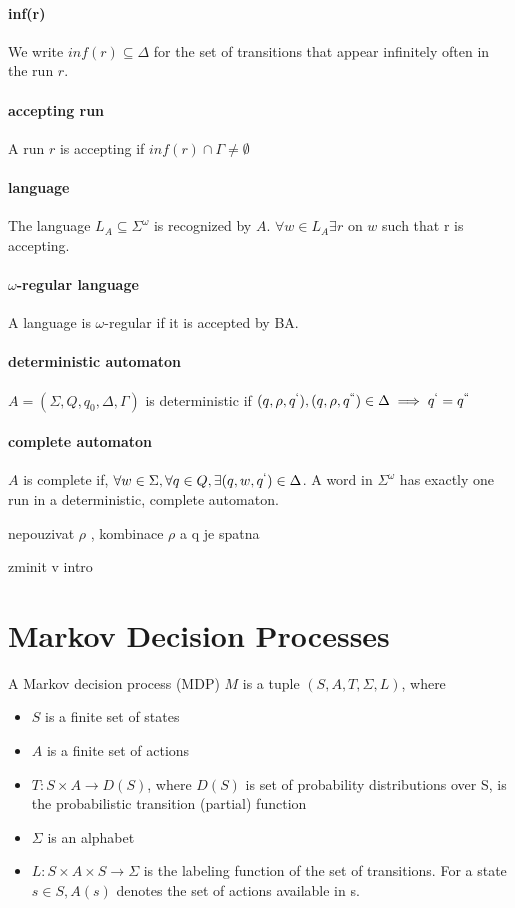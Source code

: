 \documentclass{fithesis3}
\begin{document}
		\paragraph{inf(r)}
		We write $inf(r) \subseteq \Delta$ for the set of transitions that appear infinitely often in the run $r$.
		\paragraph{accepting run} A run $r$ is accepting if $inf(r) \cap \Gamma \neq \emptyset$
		\paragraph{language}
		The language $L_A\subseteq\Sigma^\omega$ is recognized by $A$.\newline
		$\forall w \in L_A \exists r$ on $w$ such that r is accepting.
		\paragraph{$\omega$-regular language}
		A language is $\omega$-regular if it is accepted by BA.
		\paragraph{deterministic automaton}
		$A=(\Sigma, Q, q_0, \Delta, \Gamma)$ is deterministic if \newline$(q, \rho, q^`), (q, \rho, q^{``})\in\Delta\implies q^`=q^{``}$
		\paragraph{complete automaton}
		$A$ is complete if, $\forall w \in \Sigma, \forall q \in Q, \exists (q, w, q^`)\in\Delta$. A word in $\Sigma^\omega$ has exactly one run in a deterministic, complete automaton.
		
		nepouzivat $\rho$ , kombinace $\rho$ a q je spatna
		
		zminit v intro
		\section{Markov Decision Processes}
		A Markov decision process (MDP) $M$
		is a tuple $(S, A, T, \Sigma, L)$, where
		\begin{itemize}
			\item $S$ is a finite set of states
			\item $A$ is a finite set of actions
			\item $T:S\times A \rightarrow D(S)$, where $D(S)$ is set of probability distributions over S, is  the probabilistic transition (partial) function
			\item $\Sigma$ is an alphabet
			\item $L:S\times A \times S \rightarrow \Sigma$ is the labeling function of the set of transitions.
			For a state $s \in S, A(s)$ denotes the set of actions available in s.
		\end{itemize}
\end{document}
